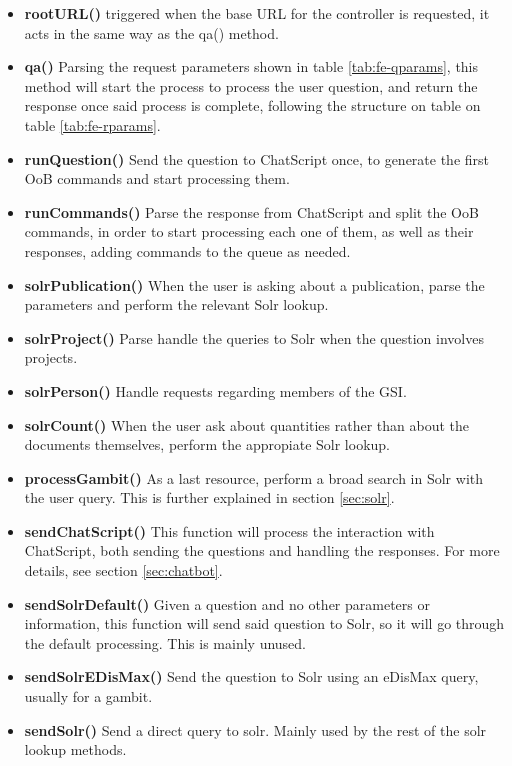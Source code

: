 \begin{itemize}
  \item \textbf{rootURL()} triggered when the base URL for the controller is requested, it acts in the same way as the qa() method.
  \item \textbf{qa()} Parsing the request parameters shown in table \ref{tab:fe-qparams}, this method will start the process to process the user question, and return the response once said process is complete, following the structure on table on table \ref{tab:fe-rparams}. 
  \item \textbf{runQuestion()} Send the question to ChatScript once, to generate the first \ac{OoB} commands and start processing them.
  \item \textbf{runCommands()} Parse the response from ChatScript and split the \ac{OoB} commands, in order to start processing each one of them, as well as their responses, adding commands to the queue as needed.
  \item \textbf{solrPublication()} When the user is asking about a publication, parse the parameters and perform the relevant Solr lookup.
  \item \textbf{solrProject()} Parse handle the queries to Solr when the question involves projects.
  \item \textbf{solrPerson()} Handle requests regarding members of the GSI.
  \item \textbf{solrCount()} When the user ask about quantities rather than about the documents themselves, perform the appropiate Solr lookup.
  \item \textbf{processGambit()} As a last resource, perform a broad search in Solr with the user query. This is further explained in section \ref{sec:solr}.
  \item \textbf{sendChatScript()} This function will process the interaction with ChatScript, both sending the questions and handling the responses. For more details, see section \ref{sec:chatbot}.
  \item \textbf{sendSolrDefault()} Given a question and no other parameters or information, this function will send said question to Solr, so it will go through the default processing. This is mainly unused.
  \item \textbf{sendSolrEDisMax()} Send the question to Solr using an \ac{eDisMax} query, usually for a gambit. 
  \item \textbf{sendSolr()} Send a direct query to solr. Mainly used by the rest of the solr lookup methods.
\end{itemize}

